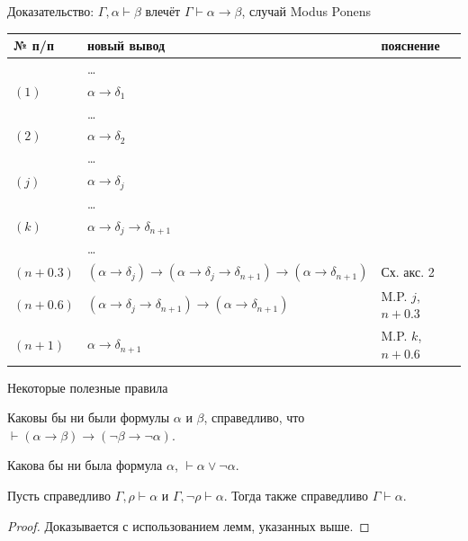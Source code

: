 \documentclass[aspectratio=169]{beamer}
\begin{document}
\begin{frame}{Доказательство: $\Gamma,\alpha\vdash\beta$ влечёт $\Gamma\vdash\alpha\rightarrow\beta$, случай Modus Ponens}
\begin{tabular}{lll}
№ п/п & новый вывод & пояснение \\
\hline
    & \dots \\
$(1)$ & $\alpha\rightarrow\delta_1$ \\
    & \dots \\
$(2)$ & $\alpha\rightarrow\delta_2$ \\
    & \dots \\
$(j)$ & $\alpha\rightarrow\delta_j$ \\
    & \dots \\
$(k)$ & $\alpha\rightarrow\delta_j\rightarrow\delta_{n+1}$ \\
    & \dots \\
\color{cyan}$(n+0.3)$ & \color{cyan}$(\alpha\rightarrow\delta_j)
    \rightarrow(\alpha\rightarrow\delta_j\rightarrow\delta_{n+1})\rightarrow(\alpha\rightarrow\delta_{n+1})$ & \color{cyan}Сх. акс. 2\\
\color{cyan}$(n+0.6)$ & \color{cyan}$(\alpha\rightarrow\delta_j
    \rightarrow\delta_{n+1})\rightarrow(\alpha\rightarrow\delta_{n+1})$ & \color{cyan}M.P. $j$, $n+0.3$\\
$(n+1)$ & $\alpha\rightarrow\delta_{n+1}$ & M.P. $k$, $n+0.6$\\
\end{tabular}
\end{frame}

\begin{frame}{Некоторые полезные правила}

\begin{lemmarus}Каковы бы ни были формулы $\alpha$ и $\beta$, справедливо, что 
$\vdash (\alpha \rightarrow \beta) \rightarrow (\neg\beta \rightarrow \neg\alpha)$.
\end{lemmarus}\pause

\begin{lemmarus}Какова бы ни была формула $\alpha$, $\vdash\alpha\vee\neg\alpha$.
\end{lemmarus}

\begin{lemmarus}
Пусть справедливо $\Gamma, \rho \vdash \alpha$ и $\Gamma, \neg \rho \vdash \alpha$.
Тогда также справедливо $\Gamma \vdash \alpha$.
\end{lemmarus}

\begin{proof}Доказывается с использованием лемм, указанных выше.\end{proof}

\end{frame}
\end{document}
